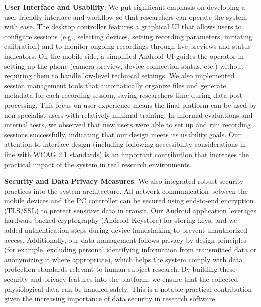 \textbf{User Interface and Usability}: We put significant emphasis on developing a user-friendly interface and workflow so that researchers can operate the system with ease. The desktop controller features a graphical UI that allows users to configure sessions (e.g., selecting devices, setting recording parameters, initiating calibration) and to monitor ongoing recordings through live previews and status indicators. On the mobile side, a simplified Android UI guides the operator in setting up the phone (camera preview, device connection status, etc.) without requiring them to handle low-level technical settings. We also implemented session management tools that automatically organize files and generate metadata for each recording session, saving researchers time during data post-processing. This focus on user experience means the final platform can be used by non-specialist users with relatively minimal training. In informal evaluations and internal tests, we observed that new users were able to set up and run recording sessions successfully, indicating that our design meets its usability goals. Our attention to interface design (including following accessibility considerations in line with WCAG 2.1 standards) is an important contribution that increases the practical impact of the system in real research environments.

\textbf{Security and Data Privacy Measures}: We also integrated robust security practices into the system architecture. All network communication between the mobile devices and the PC controller can be secured using end-to-end encryption (TLS/SSL) to protect sensitive data in transit. Our Android application leverages hardware-backed cryptography (Android Keystore) for storing keys, and we added authentication steps during device handshaking to prevent unauthorized access. Additionally, our data management follows privacy-by-design principles (for example, excluding personal identifying information from transmitted data or anonymizing it where appropriate), which helps the system comply with data protection standards relevant to human subject research. By building these security and privacy features into the platform, we ensure that the collected physiological data can be handled safely. This is a notable practical contribution given the increasing importance of data security in research software.

